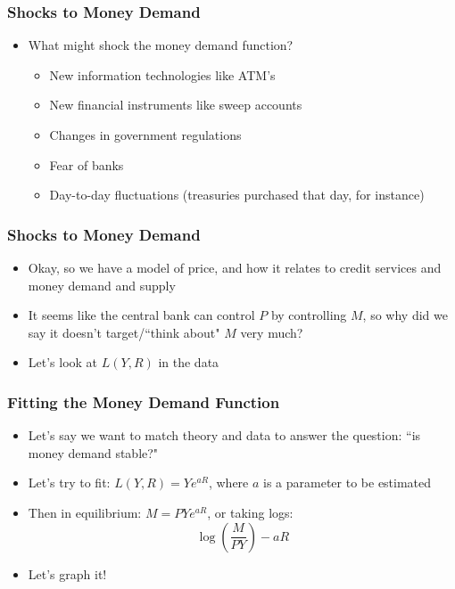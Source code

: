 \documentclass{beamer}
\begin{document}
\begin{frame}
\frametitle[alignment=center]{Shocks to Money Demand}
\begin{itemize}
\item What might shock the money demand function?
\begin{itemize}
\item New information technologies like ATM's
\bigskip
\item New financial instruments like sweep accounts
\bigskip
\item Changes in government regulations
\bigskip
\item Fear of banks
\bigskip
\item Day-to-day fluctuations (treasuries purchased that day, for instance)
\end{itemize}
\end{itemize}
\end{frame}

\begin{frame}
\frametitle[alignment=center]{Shocks to Money Demand}
\begin{itemize}
\item Okay, so we have a model of price, and how it relates to credit services and money demand and supply
\bigskip
\item It seems like the central bank can control $P$ by controlling $M$, so why did we say it doesn't target/``think about" $M$ very much?
\bigskip
\item Let's look at $L(Y,R)$ in the data
\end{itemize}
\end{frame}


\begin{frame}
\frametitle[alignment=center]{Fitting the Money Demand Function}
\begin{itemize}
\item Let's say we want to match theory and data to answer the question: ``is money demand stable?"
\bigskip
\item Let's try to fit: $L(Y,R)=Ye^{aR}$, where $a$ is a parameter to be estimated
\bigskip
\item Then in equilibrium: $M=PYe^{aR}$, or taking logs:
$$\log\left(\frac{M}{PY}\right)-aR$$
\item Let's graph it!
\end{itemize}
\end{frame}
\end{document}
